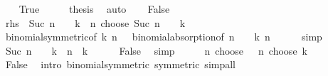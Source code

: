 \begin{isabellebody}
\ \ \isamarkupfalse%
\ True\isanewline
\ \ \isamarkupfalse%
\ \isamarkupfalse%
\ {\isacharquery}{\kern0pt}thesis\ \isamarkupfalse%
\ auto\isanewline
{}\isamarkupfalse%
\isanewline
\ \ \isamarkupfalse%
\ False\isanewline
\ \ \isamarkupfalse%
\ \isamarkupfalse%
\ {\isachardoublequoteopen}{\isacharquery}{\kern0pt}rhs\ {\isacharequal}{\kern0pt}\ Suc\ {\isacharparenleft}{\kern0pt}{\isacharparenleft}{\kern0pt}n\ {\isacharminus}{\kern0pt}\ {}{\isacharparenright}{\kern0pt}\ {\isacharminus}{\kern0pt}\ k{\isacharparenright}{\kern0pt}\ {\isacharasterisk}{\kern0pt}\ {\isacharparenleft}{\kern0pt}n\ choose\ Suc\ {\isacharparenleft}{\kern0pt}{\isacharparenleft}{\kern0pt}n\ {\isacharminus}{\kern0pt}\ {}{\isacharparenright}{\kern0pt}\ {\isacharminus}{\kern0pt}\ k{\isacharparenright}{\kern0pt}{\isacharparenright}{\kern0pt}{\isachardoublequoteclose}\isanewline
\ \ \ \ \isamarkupfalse%
\ binomial{\isacharunderscore}{\kern0pt}symmetric{\isacharbrackleft}{\kern0pt}of\ k\ {\isachardoublequoteopen}n\ {\isacharminus}{\kern0pt}\ {}{\isachardoublequoteclose}{\isacharbrackright}{\kern0pt}\ binomial{\isacharunderscore}{\kern0pt}absorption{\isacharbrackleft}{\kern0pt}of\ {\isachardoublequoteopen}{\isacharparenleft}{\kern0pt}n\ {\isacharminus}{\kern0pt}\ {}{\isacharparenright}{\kern0pt}\ {\isacharminus}{\kern0pt}\ k{\isachardoublequoteclose}\ n{\isacharbrackright}{\kern0pt}\isanewline
\ \ \ \ \isamarkupfalse%
\ simp\isanewline
\ \ \isamarkupfalse%
\ \isamarkupfalse%
\ {\isachardoublequoteopen}Suc\ {\isacharparenleft}{\kern0pt}{\isacharparenleft}{\kern0pt}n\ {\isacharminus}{\kern0pt}\ {}{\isacharparenright}{\kern0pt}\ {\isacharminus}{\kern0pt}\ k{\isacharparenright}{\kern0pt}\ {\isacharequal}{\kern0pt}\ n\ {\isacharminus}{\kern0pt}\ k{\isachardoublequoteclose}\isanewline
\ \ \ \ \isamarkupfalse%
\ False\ \isamarkupfalse%
\ simp\isanewline
\ \ \isamarkupfalse%
\ \isamarkupfalse%
\ {\isachardoublequoteopen}n\ choose\ {\isasymdots}\ {\isacharequal}{\kern0pt}\ n\ choose\ k{\isachardoublequoteclose}\isanewline
\ \ \ \ \isamarkupfalse%
\ False\ \isamarkupfalse%
\ {\isacharparenleft}{\kern0pt}intro\ binomial{\isacharunderscore}{\kern0pt}symmetric\ {\isacharbrackleft}{\kern0pt}symmetric{\isacharbrackright}{\kern0pt}{\isacharparenright}{\kern0pt}\ simp{\isacharunderscore}{\kern0pt}all\isanewline

\end{isabellebody}
